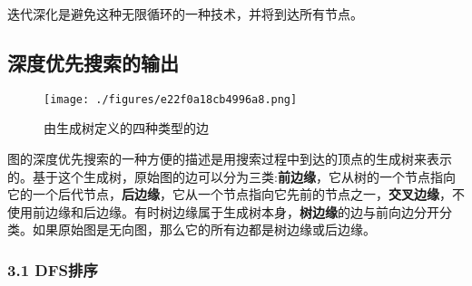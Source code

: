 迭代深化是避免这种无限循环的一种技术，并将到达所有节点。

\subsection{深度优先搜索的输出}
\begin{figure}[ht]
\centering
\texttt{[image: ./figures/e22f0a18cb4996a8.png]}
\caption{由生成树定义的四种类型的边} \label{fig_SDYXSS_2}
\end{figure}
图的深度优先搜索的一种方便的描述是用搜索过程中到达的顶点的生成树来表示的。基于这个生成树，原始图的边可以分为三类:\textbf{前边缘}，它从树的一个节点指向它的一个后代节点，\textbf{后边缘}，它从一个节点指向它先前的节点之一，\textbf{交叉边缘}，不使用前边缘和后边缘。有时树边缘属于生成树本身，\textbf{树边缘}的边与前向边分开分类。如果原始图是无向图，那么它的所有边都是树边缘或后边缘。
\subsubsection{3.1 DFS排序}